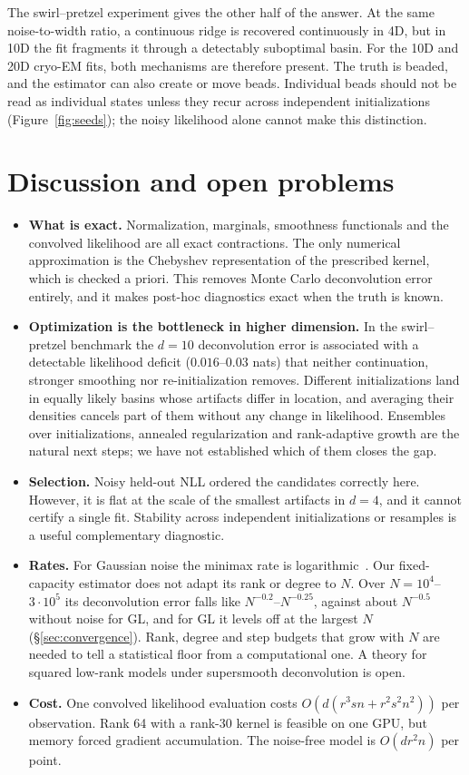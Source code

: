 The swirl--pretzel experiment gives the other half of the answer. At the same noise-to-width ratio, a continuous
ridge is recovered continuously in 4D, but in 10D the fit fragments it through a detectably suboptimal basin. For
the 10D and 20D cryo-EM fits, both mechanisms are therefore present. The truth is beaded, and the estimator can
also create or move beads. Individual beads should not be read as individual states unless they recur across
independent initializations (Figure~\ref{fig:seeds}); the noisy likelihood alone cannot make this distinction.

\section{Discussion and open problems}
\label{sec:discussion}
\begin{itemize}[leftmargin=2em,itemsep=2pt]
\item \textbf{What is exact.} Normalization, marginals, smoothness functionals and the convolved likelihood are all exact
contractions. The only numerical approximation is the Chebyshev representation of the prescribed kernel, which is
checked a priori. This removes Monte Carlo deconvolution error entirely, and it makes post-hoc diagnostics exact
when the truth is known.
\item \textbf{Optimization is the bottleneck in higher dimension.} In the swirl--pretzel benchmark the $d=10$ deconvolution
error is associated with a detectable likelihood deficit ($0.016$--$0.03$ nats) that neither continuation, stronger
smoothing nor re-initialization removes. Different initializations land in equally likely basins whose artifacts
differ in location, and averaging their densities cancels part of them without any change in likelihood. Ensembles
over initializations, annealed regularization and rank-adaptive growth are the natural next steps; we have not
established which of them closes the gap.
\item \textbf{Selection.} Noisy held-out NLL ordered the candidates correctly here. However, it is flat at the scale of
the smallest artifacts in $d=4$, and it cannot certify a single fit. Stability across independent initializations
or resamples is a useful complementary diagnostic.
\item \textbf{Rates.} For Gaussian noise the minimax rate is logarithmic~\cite{fan1991optimal}. Our fixed-capacity
estimator does not adapt its rank or degree to $N$. Over $N=10^4$--$3\cdot10^5$ its deconvolution error falls like
$N^{-0.2}$--$N^{-0.25}$, against about $N^{-0.5}$ without noise for GL, and for GL it levels off at the largest $N$
(\S\ref{sec:convergence}). Rank, degree and step budgets that grow with $N$ are needed to tell a statistical floor
from a computational one. A theory for squared low-rank models under supersmooth deconvolution is open.
\item \textbf{Cost.} One convolved likelihood evaluation costs $O(d(r^3sn+r^2s^2n^2))$ per observation. Rank 64 with a
rank-30 kernel is feasible on one GPU, but memory forced gradient accumulation. The noise-free model is
$O(dr^2n)$ per point.
\end{itemize}


